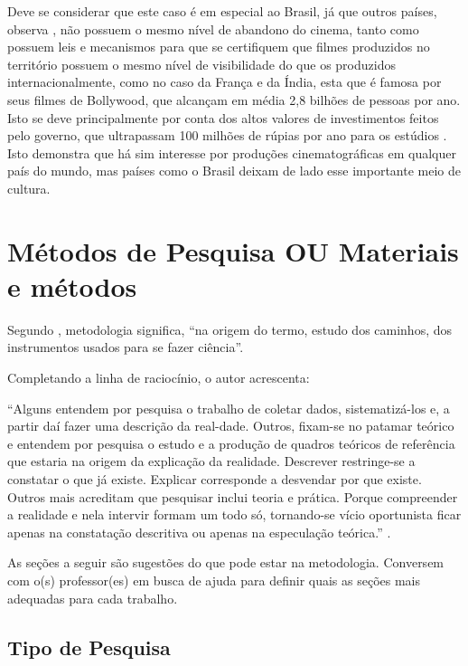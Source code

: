 \documentclass[
	article,			%
	12pt,				%
	oneside,			%
	a4paper,			%
	english,			%
	brazil,				%
	sumario=tradicional
	]{abntex2}
\begin{document}
Deve se considerar que este caso é em especial ao Brasil, já que outros países, observa , não possuem o mesmo nível de abandono do cinema, tanto como possuem leis e mecanismos para que se certifiquem que filmes produzidos no território possuem o mesmo nível de visibilidade do que os produzidos internacionalmente, como no caso da França e da Índia, esta que é famosa por seus filmes de Bollywood, que alcançam em média 2,8 bilhões de pessoas por ano. Isto se deve principalmente por conta dos altos valores de investimentos feitos pelo governo, que ultrapassam 100 milhões de rúpias por ano para os estúdios \cite{LUCIANA}. Isto demonstra que há sim interesse por produções cinematográficas em qualquer país do mundo, mas países como o Brasil deixam de lado esse importante meio de cultura.

\section{Métodos de Pesquisa OU Materiais e métodos}

Segundo , metodologia significa, “na origem do termo, estudo dos caminhos, dos instrumentos usados para se fazer ciência”.

Completando a linha de raciocínio, o autor acrescenta:

    \begin{citacao}
    “Alguns entendem por pesquisa o trabalho de coletar dados, sistematizá-los e, a partir daí fazer uma descrição da real-dade. Outros, fixam-se no patamar teórico e entendem por pesquisa o estudo e a produção de quadros teóricos de referência que estaria na origem da explicação da realidade. Descrever restringe-se a constatar o que já existe. Explicar corresponde a desvendar por que existe. Outros mais acreditam que pesquisar inclui teoria e prática. Porque compreender a realidade e nela intervir formam um todo só, tornando-se vício oportunista ficar apenas na constatação descritiva ou apenas na especulação teórica.”
    \lipsum[5] \cite{PESQUISA:DEMO}.
    \end{citacao}



As seções a seguir são sugestões do que pode estar na metodologia. Conversem com o(s) professor(es) em busca de ajuda para definir quais as seções mais adequadas para cada trabalho.

\subsection{Tipo de Pesquisa}
\lipsum[1]
\end{document}
